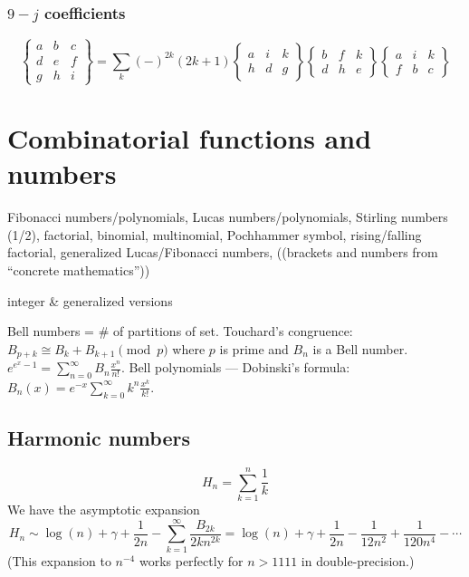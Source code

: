 \documentclass[10pt,dvipdfmx,letterpaper,twoside]{article}
\let\gam=\gamma
\begin{document}
\subsubsection{$9-j$ coefficients}
\[\left\{\begin{matrix}a&b&c\\d&e&f\\g&h&i\end{matrix}\right\} = \sum_k(-)^{2k}(2k+1)
 \left\{\begin{matrix}a&i&k\\h&d&g\end{matrix}\right\}
 \left\{\begin{matrix}b&f&k\\d&h&e\end{matrix}\right\}
 \left\{\begin{matrix}a&i&k\\f&b&c\end{matrix}\right\}
\]

\section{Combinatorial functions and numbers}
Fibonacci numbers/polynomials, Lucas numbers/polynomials,
Stirling numbers (1/2), factorial, binomial, multinomial,
Pochhammer symbol, rising/falling factorial, 
generalized Lucas/Fibonacci numbers,
((brackets and numbers from ``concrete mathematics''))

integer \& generalized versions

Bell numbers = \# of partitions of set.  Touchard's congruence: $B_{p+k}\cong B_k + B_{k+1}\pmod{p}$
where $p$ is prime and $B_n$ is a Bell number.  $e^{e^x-1} = \sum_{n=0}^\infty B_n \frac{x^n}{n!}$.
Bell polynomials --- Dobinski's formula: $B_n(x) = e^{-x}\sum_{k=0}^\infty k^n \frac{x^k}{k!}$.

\subsection{Harmonic numbers}

\[ H_n = \sum_{k=1}^n \frac{1}{k} \]
We have the asymptotic expansion
\[ H_n \sim \log(n) + \gam + \frac{1}{2n} - \sum_{k=1}^\infty\frac{B_{2k}}{2k n^{2k}}
  = \log(n) + \gam + \frac{1}{2n} - \frac{1}{12n^2} + \frac{1}{120 n^4} - \cdots \]
(This expansion to $n^{-4}$ works perfectly for $n>1111$ in double-precision.)
\end{document}
